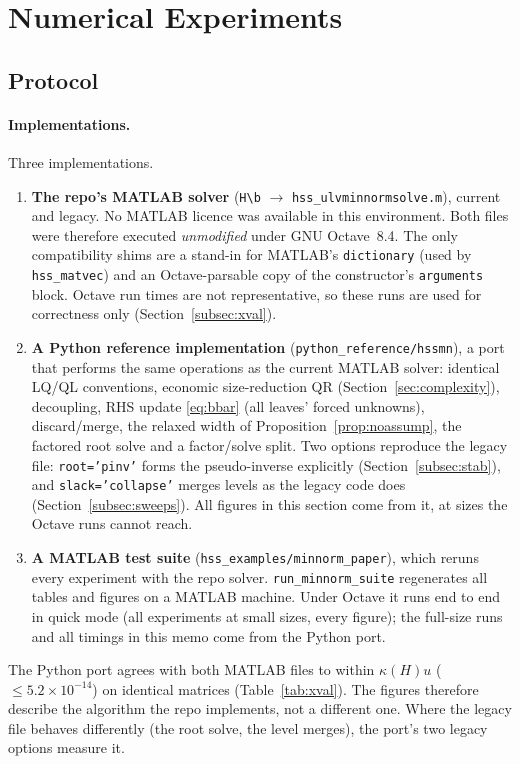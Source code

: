 \section{Numerical Experiments}\label{sec:numerics}

\subsection{Protocol}\label{subsec:protocol}
\paragraph{Implementations.} Three implementations.
\begin{enumerate}[leftmargin=1.5em,itemsep=1pt]
\item \textbf{The repo's MATLAB solver} (\texttt{H\textbackslash b} $\to$ \texttt{hss\_ulvminnormsolve.m}), current
and legacy. No MATLAB licence was available in this environment. Both files were therefore executed
\emph{unmodified} under GNU Octave~8.4. The only compatibility shims are a stand-in for
MATLAB's \texttt{dictionary} (used by \texttt{hss\_matvec}) and an Octave-parsable copy of the
constructor's \texttt{arguments} block. Octave run times are not representative, so these runs are
used for correctness only (Section~\ref{subsec:xval}).
\item \textbf{A Python reference implementation} (\texttt{python\_reference/hssmn}), a port that performs
the same operations as the current MATLAB solver: identical LQ/QL conventions, economic size-reduction QR
(Section~\ref{sec:complexity}), decoupling, RHS update \eqref{eq:bbar} (all leaves' forced unknowns),
discard/merge, the relaxed width of Proposition~\ref{prop:noassump}, the factored root solve and a
factor/solve split. Two options reproduce the legacy file: \texttt{root='pinv'} forms the pseudo-inverse
explicitly (Section~\ref{subsec:stab}), and \texttt{slack='collapse'} merges levels as the legacy code does
(Section~\ref{subsec:sweeps}). All figures in this section come from it, at sizes the Octave runs cannot
reach.
\item \textbf{A MATLAB test suite} (\texttt{hss\_examples/minnorm\_paper}), which reruns every
experiment with the repo solver. \texttt{run\_minnorm\_suite} regenerates all tables and figures on a
MATLAB machine. Under Octave it runs end to end in quick mode (all experiments at small sizes, every
figure); the full-size runs and all timings in this memo come from the Python port.
\end{enumerate}
The Python port agrees with both MATLAB files to within $\kappa(H)u$ ($\le5.2\times10^{-14}$) on identical
matrices (Table~\ref{tab:xval}). The figures therefore describe the algorithm the repo implements,
not a different one. Where the legacy file behaves differently (the root solve, the level merges), the
port's two legacy options measure it.


